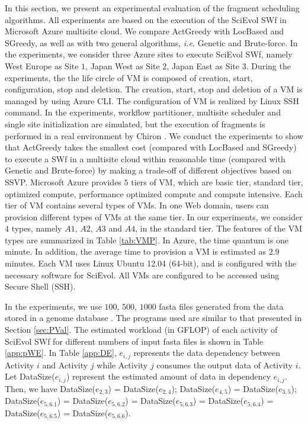In this section, we present an experimental evaluation of the fragment scheduling algorithms. 
All experiments are based on the execution of the SciEvol SWf in Microsoft Azure multisite cloud.
We compare ActGreedy with LocBased and SGreedy, as well as with two general algorithms, \textit{i.e.} Genetic and Brute-force.
In the experiments, we consider three Azure \cite{Azure} sites to execute SciEvol SWf, namely West Europe as Site $1$, Japan West as Site $2$, Japan East as Site $3$.
During the experiments, the the life circle of VM is composed of creation, start, configuration, stop and deletion. The creation, start, stop and deletion of a VM is managed by using Azure CLI. The configuration of VM is realized by Linux SSH command.
In the experiments, workflow partitioner, multisite scheduler and single site initialization are simulated, but the execution of fragments is performed in a real environment by Chiron \cite{Ogasawara2013}. 
We conduct the experiments to show that ActGreedy takes the smallest cost (compared with LocBased and SGreedy) to execute a SWf in a multisite cloud within reasonable time (compared with Genetic and Brute-force) by making a trade-off of different objectives based on SSVP. Microsoft Azure provides $5$ tiers of VM, which are basic tier, standard tier, optimized compute, performance optimized compute and compute intensive. Each tier of VM contains several types of VMs. In one Web domain, users can provision different types of VMs at the same tier. In our experiments, we consider $4$ types, namely $A1$, $A2$, $A3$ and $A4$, in the standard tier. The features of the VM types are summarized in Table \ref{tab:VMP}. In Azure, the time quantum is one minute. In addition, the average time to provision a VM is estimated as $2.9$ minutes. Each VM uses Linux Ubuntu 12.04 (64-bit), and is configured with the necessary software for SciEvol. All VMs are configured to be accessed using Secure Shell (SSH).

In the experiments, we use $100$, $500$, $1000$ fasta files generated from the data stored in a genome database \cite{Oma}\cite{OmaGroup}. The programs used are similar to that presented in Section \ref{sec:PVal}. The estimated workload (in GFLOP) of each activity of SciEvol SWf for different numbers of input fasta files is shown in Table \ref{app:pWE}. In Table \ref{app:DE}, $e_{i,j}$ represents the data dependency between Activity $i$ and Activity $j$ while Activity $j$ consumes the output data of Activity $i$. Let DataSize($e_{i,j}$) represent the estimated amount of data in dependency $e_{i,j}$. Then, we have DataSize($e_{2,3}$) = DataSize($e_{2,4}$); DataSize($e_{4,5}$) = DataSize($e_{3,5}$); DataSize($e_{5,6.1}$) = DataSize($e_{5,6.2}$) = DataSize($e_{5,6.3}$) = DataSize($e_{5,6.4}$) = DataSize($e_{5,6.5}$) = DataSize($e_{5,6.6}$).


